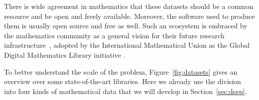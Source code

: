 There is wide agreement in mathematics that these datasets should be a common resource and be open and freely available.
Moreover, the software used to produce them is usually open source and free as well.
Such an ecosystem is embraced by the mathematics community as a general vision for their future research infrastructure~\cite{NAS14}, adopted by the International Mathematical Union as the Global Digital Mathematics Library initiative \cite{GDML:on}.

To better understand the scale of the problem, Figure~\ref{fig:datasets} gives an overview over some state-of-the-art libraries.
Here we already use the division into four kinds of mathematical data that we will develop in Section~\ref{sec:deep}.

